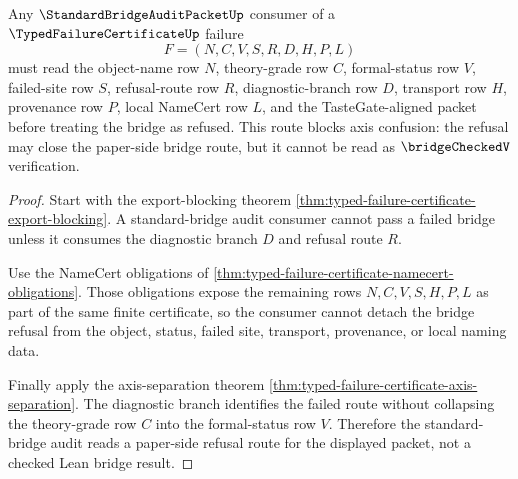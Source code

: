 \begin{theorem}
\label{thm:typed-failure-certificate-bridge-refusal-route}
Any $\StandardBridgeAuditPacketUp$ consumer of a $\TypedFailureCertificateUp$ failure
$$
F=(N,C,V,S,R,D,H,P,L)
$$
must read the object-name row $N$, theory-grade row $C$, formal-status row $V$, failed-site row $S$, refusal-route row $R$, diagnostic-branch row $D$, transport row $H$, provenance row $P$, local NameCert row $L$, and the TasteGate-aligned packet before treating the bridge as refused. This route blocks axis confusion: the refusal may close the paper-side bridge route, but it cannot be read as $\bridgeCheckedV$ verification.
\end{theorem}
\begin{proof}
Start with the export-blocking theorem \autoref{thm:typed-failure-certificate-export-blocking}. A standard-bridge audit consumer cannot pass a failed bridge unless it consumes the diagnostic branch $D$ and refusal route $R$.

Use the NameCert obligations of \autoref{thm:typed-failure-certificate-namecert-obligations}. Those obligations expose the remaining rows $N,C,V,S,H,P,L$ as part of the same finite certificate, so the consumer cannot detach the bridge refusal from the object, status, failed site, transport, provenance, or local naming data.

Finally apply the axis-separation theorem \autoref{thm:typed-failure-certificate-axis-separation}. The diagnostic branch identifies the failed route without collapsing the theory-grade row $C$ into the formal-status row $V$. Therefore the standard-bridge audit reads a paper-side refusal route for the displayed packet, not a checked Lean bridge result.
\end{proof}

